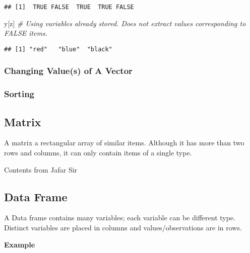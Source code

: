 \documentclass[
]{book}
\newenvironment{Shaded}{\begin{snugshade}}{\end{snugshade}}
\newcommand{\CommentTok}[1]{\textcolor[rgb]{0.56,0.35,0.01}{\textit{#1}}}
\newcommand{\NormalTok}[1]{#1}
\begin{document}
\begin{itemize}
\begin{verbatim}
## [1]  TRUE FALSE  TRUE  TRUE FALSE
\end{verbatim}

\begin{Shaded}
\begin{Highlighting}[]
\NormalTok{y[z] }\CommentTok{# Using variables already stored. Does not extract values corresponding to FALSE items. }
\end{Highlighting}
\end{Shaded}

\begin{verbatim}
## [1] "red"   "blue"  "black"
\end{verbatim}
\end{itemize}

\hypertarget{changing-values-of-a-vector}{%
\subsubsection{Changing Value(s) of A Vector}\label{changing-values-of-a-vector}}

\hypertarget{sorting}{%
\subsubsection{Sorting}\label{sorting}}

\hypertarget{matrix}{%
\subsection{Matrix}\label{matrix}}

A matrix a rectangular array of similar items. Although it has more than two rows and columns, it can only contain items of a single type.

{Contents from Jafar Sir}

\hypertarget{data-frame}{%
\subsection{Data Frame}\label{data-frame}}

A Data frame contains many variables; each variable can be different type. Distinct variables are placed in columns and values/observations are in rows.

\textbf{Example}
\end{document}
